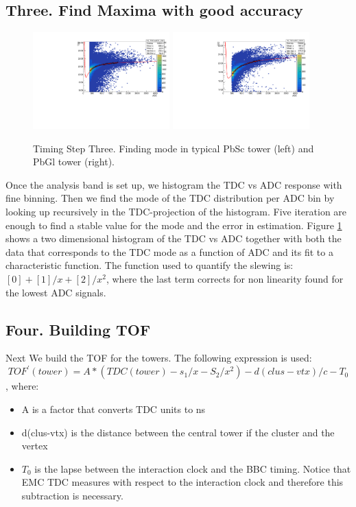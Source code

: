 \documentclass{article}
\begin{document}
\subsection{Three. Find Maxima with good accuracy}
\begin{figure}
\includegraphics[width=0.47\textwidth]{fig_pi0vn/mode_t230.pdf}
\includegraphics[width=0.47\textwidth]{fig_pi0vn/mode_t20030.pdf}
\caption{Timing Step Three. Finding mode in typical PbSc tower (left) and PbGl tower (right).}
\label{fig.tim.three}
\end{figure}
Once the analysis band is set up, we histogram the TDC vs ADC response with fine binning.
Then we find the mode of the TDC distribution per ADC bin by looking up recursively in the TDC-projection of the histogram.
Five iteration are enough to find a stable value for the mode and the error in estimation.
Figure \ref{fig.tim.three} shows a two dimensional histogram of the TDC vs ADC together with both the data that corresponds to the TDC mode as a function of ADC and its fit to a characteristic function.
The function used to quantify the slewing is: $[0]+[1]/x+[2]/x^2$, where the last term corrects for non linearity found for the lowest ADC signals.

\subsection{Four. Building TOF}
Next We build the TOF for the towers.
The following expression is used:
$$TOF^{'}(tower) = A*(TDC(tower)-s_1/x-S_2/x^2) - d(clus-vtx)/c - T_{0}$$
, where:
\begin{itemize}
\item{A} is a factor that converts TDC units to ns
\item{d(clus-vtx)} is the distance between the central tower if the cluster and the vertex
\item$T_{0}$ is the lapse between the interaction clock and the BBC timing. Notice that EMC TDC measures with respect to the interaction clock and therefore this subtraction is necessary.
\end{itemize}
\end{document}

